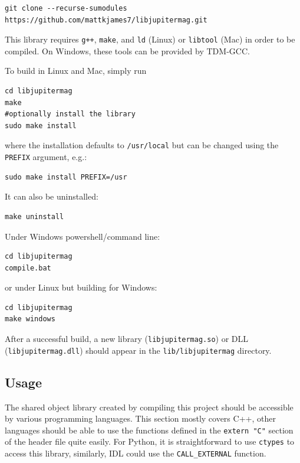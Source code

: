		\begin{verbatim}
git clone --recurse-sumodules https://github.com/mattkjames7/libjupitermag.git
		\end{verbatim}
	
		This library requires \texttt{g++}, \texttt{make}, and \texttt{ld} (Linux) or \texttt{libtool} (Mac) in order to be compiled. On Windows, these tools can be provided by TDM-GCC.
	
		To build in Linux and Mac, simply run
	
		\begin{verbatim}
cd libjupitermag
make
#optionally install the library
sudo make install
		\end{verbatim}
	
		where the installation defaults to \texttt{/usr/local} but can be changed using the \texttt{PREFIX} argument, e.g.:
	
		\begin{verbatim}
sudo make install PREFIX=/usr
		\end{verbatim}
	
		It can also be uninstalled:
	
		\begin{verbatim}
make uninstall
		\end{verbatim}
	
		Under Windows powershell/command line:
	
		\begin{verbatim}
cd libjupitermag
compile.bat
		\end{verbatim}
	
		or under Linux but building for Windows:
	
		\begin{verbatim}
cd libjupitermag
make windows
		\end{verbatim}
	
		After a successful build, a new library (\texttt{libjupitermag.so}) or DLL (\texttt{libjupitermag.dll}) should appear in the \texttt{lib/libjupitermag} directory.
	
	\subsection{Usage}
	
		The shared object library created by compiling this project should be accessible by various programming languages. This section mostly covers C++, other languages should be able to use the functions defined in the \texttt{extern "C"} section of the header file quite easily. For Python, it is straightforward to use \texttt{ctypes} to access this library, similarly, IDL could use the \texttt{CALL\_EXTERNAL} function.
	

